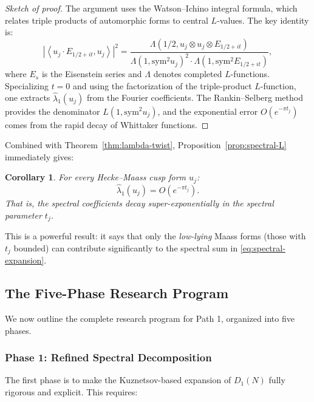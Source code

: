 \documentclass[11pt,a4paper]{article}
\theoremstyle{plain}
\newtheorem{corollary}[theorem]{Corollary}
\theoremstyle{definition}
\newcommand{\sym}{\mathrm{sym}}
\newcommand{\ip}[2]{\left\langle #1, #2 \right\rangle}
\begin{document}
\begin{proof}[Sketch of proof]
The argument uses the Watson--Ichino integral formula, which relates triple products of automorphic forms to central $L$-values. The key identity is:
\[
\left|\ip{u_j \cdot E_{1/2+it}}{u_j}\right|^2 = \frac{\Lambda(1/2, u_j \otimes u_j \otimes E_{1/2+it})}{\Lambda(1, \sym^2 u_j)^2 \cdot \Lambda(1, \sym^2 E_{1/2+it})},
\]
where $E_s$ is the Eisenstein series and $\Lambda$ denotes completed $L$-functions. Specializing $t = 0$ and using the factorization of the triple-product $L$-function, one extracts $\hat{\lambda}_1(u_j)$ from the Fourier coefficients. The Rankin--Selberg method provides the denominator $L(1, \sym^2 u_j)$, and the exponential error $O(e^{-\pi t_j})$ comes from the rapid decay of Whittaker functions.
\end{proof}

Combined with Theorem~\ref{thm:lambda-twist}, Proposition~\ref{prop:spectral-L} immediately gives:

\begin{corollary}
\label{cor:spectral-vanishing}
For every Hecke--Maass cusp form $u_j$:
\begin{equation}
\label{eq:spectral-vanishing}
\hat{\lambda}_1(u_j) = O\!\left(e^{-\pi t_j}\right).
\end{equation}
That is, the spectral coefficients decay super-exponentially in the spectral parameter $t_j$.
\end{corollary}

This is a powerful result: it says that only the \emph{low-lying} Maass forms (those with $t_j$ bounded) can contribute significantly to the spectral sum in \eqref{eq:spectral-expansion}.

\subsection{The Five-Phase Research Program}
\label{subsec:five-phase}

We now outline the complete research program for Path 1, organized into five phases.

\subsubsection{Phase 1: Refined Spectral Decomposition}

The first phase is to make the Kuznetsov-based expansion of $D_1(N)$ fully rigorous and explicit. This requires:
\end{document}
